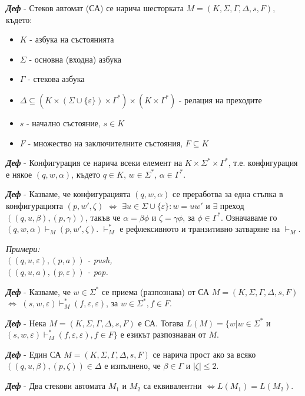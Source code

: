\documentclass[fleqn,12pt]{article}
\begin{document}
\begin{flushleft}
\textit{\textbf{Деф}} - Стеков автомат (СА) се нарича шесторката $M = (K, \Sigma, \Gamma, \Delta, s, F)$, където:
\begin{itemize}
    \item $K$ - азбука на състоянията
    \item $\Sigma$ - основна (входна) азбука
    \item $\Gamma$ - стекова азбука
    \item $\Delta \subseteq (K \times (\Sigma \cup \{\varepsilon\}) \times \Gamma^*) \times (K \times \Gamma^*)$ - релация на преходите
    \item $s$ - начално състояние, $s \in K$
    \item $F$ - множество на заключителните състояния, $F \subseteq K$
\end{itemize}

\textit{\textbf{Деф}} - Конфигурация се нарича всеки елемент на $K \times \Sigma^* \times \Gamma^*$, т.е. конфигурация е някое $(q, w, \alpha)$, където $q \in K$, $w \in \Sigma^*$, $\alpha \in \Gamma^*$.

\textit{\textbf{Деф}} - Казваме, че конфигурацията $(q, w, \alpha)$ се преработва за една стъпка в конфигурацията $(p, w', \zeta)$ $\iff$ $\exists u \in \Sigma \cup \{\varepsilon\}: w=uw'$ и $\exists$ преход $((q, u, \beta), (p, \gamma))$, 
такъв че $\alpha = \beta\phi$ и $\zeta = \gamma\phi$, за $\phi \in \Gamma^*$. Означаваме го $(q, w, \alpha) \vdash_M (p, w', \zeta)$. $\vdash_M^*$ е рефлексивното и транзитивно затваряне на $\vdash_M$.

\textit{Примери:\\
$((q, u, \varepsilon), (p, a))$ - push, \\
$((q, u, a), (p, \varepsilon))$ - pop.
}

\textit{\textbf{Деф}} - Казваме, че $w \in \Sigma^*$ се приема (разпознава) от СА $M = (K, \Sigma, \Gamma, \Delta, s, F)$ $\iff$ $(s, w, \varepsilon) \vdash_M^* (f, \varepsilon, \varepsilon)$, за $w \in \Sigma^*, f \in F$.

\textit{\textbf{Деф}} - Нека $M = (K, \Sigma, \Gamma, \Delta, s, F)$ е СА. Тогава $L(M) = \{w | w \in \Sigma^*$ и $ (s, w, \varepsilon) \vdash_M^* (f, \varepsilon, \varepsilon), f \in F\}$ е езикът разпознаван от $M$.

\textit{\textbf{Деф}} - Един СА $M = (K, \Sigma, \Gamma, \Delta, s, F)$ се нарича прост ако за всяко $((q, u, \beta), (p, \zeta)) \in \Delta$ е изпълнено, че $\beta \in \Gamma$ и $|\zeta| \leq 2$.

\textit{\textbf{Деф}} - Два стекови автомата $M_1$ и $M_2$ са еквивалентни $\iff L(M_1) = L(M_2)$.


\end{flushleft}
\end{document}
